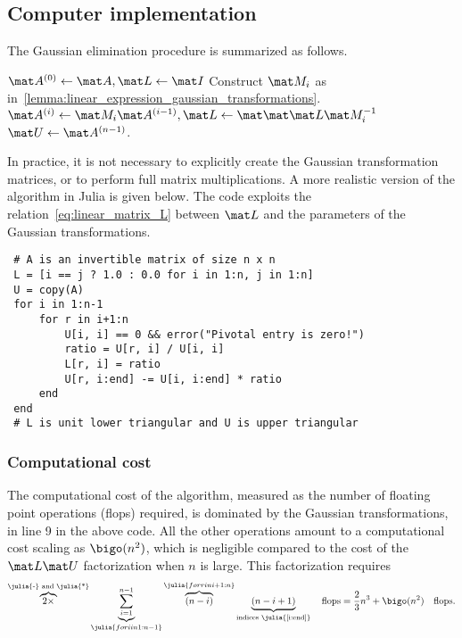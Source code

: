 \subsection*{Computer implementation}%
\label{sub:computer_implementation}

The Gaussian elimination procedure is summarized as follows.

\begin{algorithmic}
\State $\mat A^{(0)} \gets \mat A, \mat L \gets \mat I$
    \State Construct $\mat M_{i}$ as in~\cref{lemma:linear_expression_gaussian_transformations}.
    \State $\mat A^{(i)} \gets \mat M_{i} \mat A^{(i-1)}, \mat L \gets \mat \mat \mat L \mat M_i^{-1}$
\EndFor
\State $\mat U \gets \mat A^{(n-1)}$.
\end{algorithmic}

In practice, it is not necessary to explicitly create the Gaussian transformation matrices,
or to perform full matrix multiplications.
A more realistic version of the algorithm in Julia is given below.
The code exploits the relation~\eqref{eq:linear_matrix_L} between $\mat L$ and the parameters of the Gaussian transformations.
\begin{verbatim}
 # A is an invertible matrix of size n x n
 L = [i == j ? 1.0 : 0.0 for i in 1:n, j in 1:n]
 U = copy(A)
 for i in 1:n-1
     for r in i+1:n
         U[i, i] == 0 && error("Pivotal entry is zero!")
         ratio = U[r, i] / U[i, i]
         L[r, i] = ratio
         U[r, i:end] -= U[i, i:end] * ratio
     end
 end
 # L is unit lower triangular and U is upper triangular
\end{verbatim}

\subsubsection*{Computational cost}%
\label{ssub:computational_cost}
The computational cost of the algorithm,
measured as the number of floating point operations (flops) required,
is dominated by the Gaussian transformations,
in line 9 in the above code.
All the other operations amount to a computational cost scaling as $\bigo(n^2)$,
which is negligible compared to the cost of the $\mat L \mat U$ factorization when $n$ is large.
This factorization requires
\[
    \overbrace{2\times}^{\text{\julia{-} and \julia{*}}} \underbrace{\sum_{i=1}^{n-1}}_{\julia{for i in 1:n-1}} \overbrace{(n - i)}^{\julia{for r in i+1:n}} \underbrace{(n - i + 1)}_{\text{indices \julia{[i:end]}}} \quad \mathrm{flops}
    = \frac{2}{3} n^3 + \bigo(n^2) \quad \mathrm{flops}.
\]

